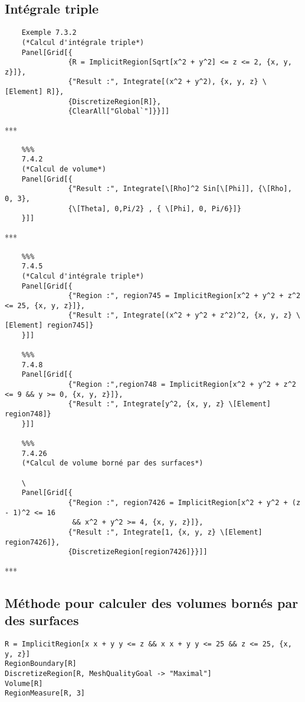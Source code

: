 \subsection{Intégrale triple}
	\begin{verbatim}
	Exemple 7.3.2
	(*Calcul d'intégrale triple*)
	Panel[Grid[{
	           {R = ImplicitRegion[Sqrt[x^2 + y^2] <= z <= 2, {x, y, z}]},
	           {"Result :", Integrate[(x^2 + y^2), {x, y, z} \[Element] R]},
	           {DiscretizeRegion[R]},
	           {ClearAll["Global`"]}}]]
	\end{verbatim}
	\begin{center}***\end{center}
	\begin{verbatim}
	%%%
	7.4.2
	(*Calcul de volume*)
	Panel[Grid[{
	           {"Result :", Integrate[\[Rho]^2 Sin[\[Phi]], {\[Rho], 0, 3},
	           {\[Theta], 0,Pi/2} , { \[Phi], 0, Pi/6}]}
	}]]
	\end{verbatim}
	\begin{center}***\end{center}
	\begin{verbatim}
	%%%
	7.4.5
	(*Calcul d'intégrale triple*)
	Panel[Grid[{
	           {"Region :", region745 = ImplicitRegion[x^2 + y^2 + z^2 <= 25, {x, y, z}]},
	           {"Result :", Integrate[(x^2 + y^2 + z^2)^2, {x, y, z} \[Element] region745]}
	}]]
	
	%%%
	7.4.8
	Panel[Grid[{
	           {"Region :",region748 = ImplicitRegion[x^2 + y^2 + z^2 <= 9 && y >= 0, {x, y, z}]},
	           {"Result :", Integrate[y^2, {x, y, z} \[Element] region748]}
	}]]
	
	%%%
	7.4.26
	(*Calcul de volume borné par des surfaces*)

	\
	Panel[Grid[{
	           {"Region :", region7426 = ImplicitRegion[x^2 + y^2 + (z - 1)^2 <= 16
	            && x^2 + y^2 >= 4, {x, y, z}]},
	           {"Result :", Integrate[1, {x, y, z} \[Element] region7426]},
	           {DiscretizeRegion[region7426]}}]]
	\end{verbatim}
	\begin{center}***\end{center}	
\subsection{Méthode pour calculer des volumes bornés par des surfaces}
		\begin{flushleft}
			\verb|R = ImplicitRegion[x x + y y <= z && x x + y y <= 25 && z <= 25, {x, y, z}]|\\
			\verb|RegionBoundary[R]|\\
			\verb|DiscretizeRegion[R, MeshQualityGoal -> "Maximal"]|\\
			\verb|Volume[R]|\\
			\verb|RegionMeasure[R, 3]|
		\end{flushleft}	